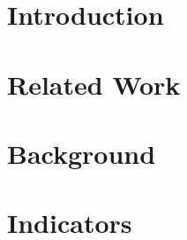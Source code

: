
\addtolength{\evensidemargin}{-12mm}

%
%
\part[Introduction]{Introduction}
\label{part:introAndBackgroundTheory}


%

\part[Related Work]{Related Work}
\label{part:relatedWork}


\part[Background]{Background}
\label{part:background}


\part{Indicators}
\label{part:indicators}


%
% 
%
% 
% 

% 
% 
% 


